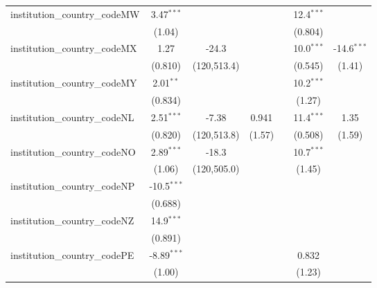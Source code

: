 \begin{tabular}{lcccccc}
   institution\_country\_codeMW          & 3.47$^{***}$   &               &               &            & 12.4$^{***}$  &   \\   
                                         & (1.04)         &               &               &            & (0.804)       &   \\   
   institution\_country\_codeMX          & 1.27           & -24.3         &               &            & 10.0$^{***}$  & -14.6$^{***}$\\   
                                         & (0.810)        & (120,513.4)   &               &            & (0.545)       & (1.41)\\   
   institution\_country\_codeMY          & 2.01$^{**}$    &               &               &            & 10.2$^{***}$  &   \\   
                                         & (0.834)        &               &               &            & (1.27)        &   \\   
   institution\_country\_codeNL          & 2.51$^{***}$   & -7.38         & 0.941         &            & 11.4$^{***}$  & 1.35\\   
                                         & (0.820)        & (120,513.8)   & (1.57)        &            & (0.508)       & (1.59)\\   
   institution\_country\_codeNO          & 2.89$^{***}$   & -18.3         &               &            & 10.7$^{***}$  &   \\   
                                         & (1.06)         & (120,505.0)   &               &            & (1.45)        &   \\   
   institution\_country\_codeNP          & -10.5$^{***}$  &               &               &            &               &   \\   
                                         & (0.688)        &               &               &            &               &   \\   
   institution\_country\_codeNZ          & 14.9$^{***}$   &               &               &            &               &   \\   
                                         & (0.891)        &               &               &            &               &   \\   
   institution\_country\_codePE          & -8.89$^{***}$  &               &               &            & 0.832         &   \\   
                                         & (1.00)         &               &               &            & (1.23)        &   \\   

\end{tabular}

